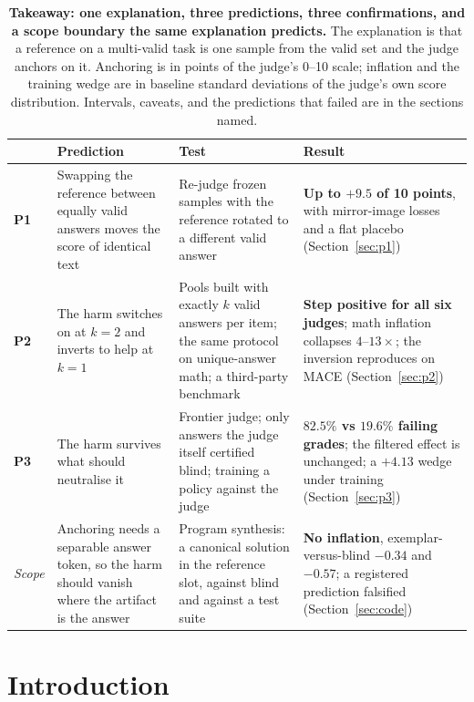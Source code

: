 \documentclass[11pt]{article}
\begin{document}
\begin{table}[t!]
\centering
\small
\setlength{\tabcolsep}{5pt}
\begin{tabular}{L{1.1cm}L{4.6cm}L{4.2cm}L{4.0cm}}
\toprule
& Prediction & Test & Result \\
\midrule
\textbf{P1} & Swapping the reference between equally valid answers moves the score of identical text &
Re-judge frozen samples with the reference rotated to a different valid answer &
\textbf{Up to $+9.5$ of 10 points}, with mirror-image losses and a flat placebo (Section~\ref{sec:p1}) \\
\addlinespace[3pt]
\textbf{P2} & The harm switches on at $k{=}2$ and inverts to help at $k{=}1$ &
Pools built with exactly $k$ valid answers per item; the same protocol on unique-answer math; a third-party benchmark &
\textbf{Step positive for all six judges}; math inflation collapses $4$--$13\times$; the inversion reproduces on \textsc{MACE} (Section~\ref{sec:p2}) \\
\addlinespace[3pt]
\textbf{P3} & The harm survives what should neutralise it &
Frontier judge; only answers the judge itself certified blind; training a policy against the judge &
\textbf{$82.5\%$ vs $19.6\%$ failing grades}; the filtered effect is unchanged; a $+4.13$ wedge under training (Section~\ref{sec:p3}) \\
\midrule
\emph{Scope} & Anchoring needs a separable answer token, so the harm should vanish where the artifact is the answer &
Program synthesis: a canonical solution in the reference slot, against blind and against a test suite &
\textbf{No inflation}, exemplar-versus-blind $-0.34$ and $-0.57$; a registered prediction falsified (Section~\ref{sec:code}) \\
\bottomrule
\end{tabular}
\caption{\textbf{Takeaway: one explanation, three predictions, three confirmations, and a scope boundary the same explanation predicts.} The explanation is that a reference on a multi-valid task is one sample from the valid set and the judge anchors on it. Anchoring is in points of the judge's 0--10 scale; inflation and the training wedge are in baseline standard deviations of the judge's own score distribution. Intervals, caveats, and the predictions that failed are in the sections named.}
\label{tab:predictions}
\end{table}

\section{Introduction}
\end{document}
